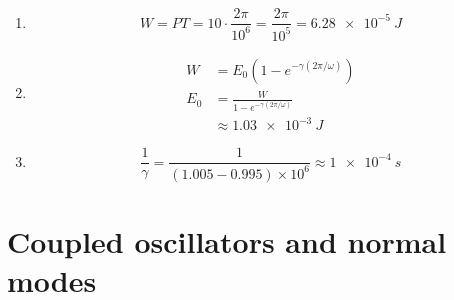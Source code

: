 \documentclass{article}
\begin{document}
\setcounter{subsection}{16}
\subsection{}

\begin{enumerate}
  \item \[W = P T = 10 \cdot \frac{2 \pi}{10^6} = \frac{2 \pi}{10^5} = \qty{6.28e-5}{J}\]

  \item

        \begin{align*}
          W   & = E_0 (1 - e^{-\gamma (2 \pi / \omega)})     \\
          E_0 & = \frac{W}{1 - e^{-\gamma (2 \pi / \omega)}} \\
              & \approx \qty{1.03e-3}{J}
        \end{align*}

  \item \[\frac{1}{\gamma} = \frac{1}{(1.005 - 0.995) \times 10^6} \approx \qty{1e-4}{s}\]
\end{enumerate}

\section{Coupled oscillators and normal modes}

\setcounter{subsection}{1}
\subsection{}
\end{document}
